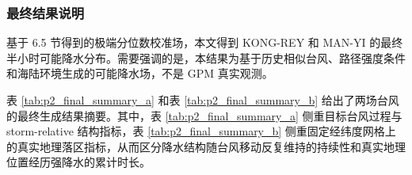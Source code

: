 \documentclass[UTF8,a4paper,zihao=5,fontset=fandol]{ctexart}
\numberwithin{equation}{section}
\numberwithin{figure}{section}
\numberwithin{table}{section}
\begin{document}
\subsubsection{最终结果说明}

基于 6.5 节得到的极端分位数校准场，本文得到 KONG-REY 和 MAN-YI 的最终半小时可能降水分布。需要强调的是，本结果为基于历史相似台风、路径强度条件和海陆环境生成的可能降水场，不是 GPM 真实观测。

表 \ref{tab:p2_final_summary_a} 和表 \ref{tab:p2_final_summary_b} 给出了两场台风的最终生成结果摘要。其中，表 \ref{tab:p2_final_summary_a} 侧重目标台风过程与 storm-relative 结构指标，表 \ref{tab:p2_final_summary_b} 侧重固定经纬度网格上的真实地理落区指标，从而区分降水结构随台风移动反复维持的持续性和真实地理位置经历强降水的累计时长。

\begingroup
\renewcommand{\thetable}{\thesection.\arabic{table}A}
\renewcommand{\theHtable}{\thetable}
\begin{table}[H]
\centering
\caption{目标台风过程与 storm-relative 结构指标（最终 Base-old 生成）}
\label{tab:p2_final_summary}
\label{tab:p2_final_summary_a}
\small
\setlength{\tabcolsep}{3pt}
\end{table}
\end{document}
